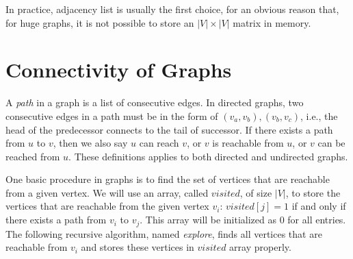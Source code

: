 In practice, adjacency list is usually the first choice, for an obvious reason that, for huge graphs, it is not possible
to store an $|V|\times |V|$ matrix in memory.

\section*{Connectivity of Graphs}

A \emph{path} in a graph is a list of consecutive edges.
In directed graphs, two consecutive edges in a path must be in the form of $(v_a, v_b), (v_b, v_c)$,
i.e., the head of the predecessor connects to the tail of successor. If there exists a path from $u$ to $v$,
then we also say $u$ can reach $v$, or $v$ is reachable from $u$, or $v$ can be reached from $u$.
These definitions applies to both directed and undirected graphs.

%


One basic procedure in graphs is to find the set of vertices that are reachable from a given vertex.
We will use an array, called $visited$, of size $|V|$, to store the vertices that are reachable from
the given vertex $v_i$: $visited[j] = 1$ if and only if there exists a path from $v_i$ to $v_j$.
This array will be initialized as 0 for all entries.
The following recursive algorithm, named \emph{explore}, finds all vertices that are reachable from $v_i$
and stores these vertices in $visited$ array properly.

\begin{minipage}{0.8\textwidth}
	\xxx
	\xxx
	\xxx
	\xxx
	\xxx
	\xxx
\end{minipage}

